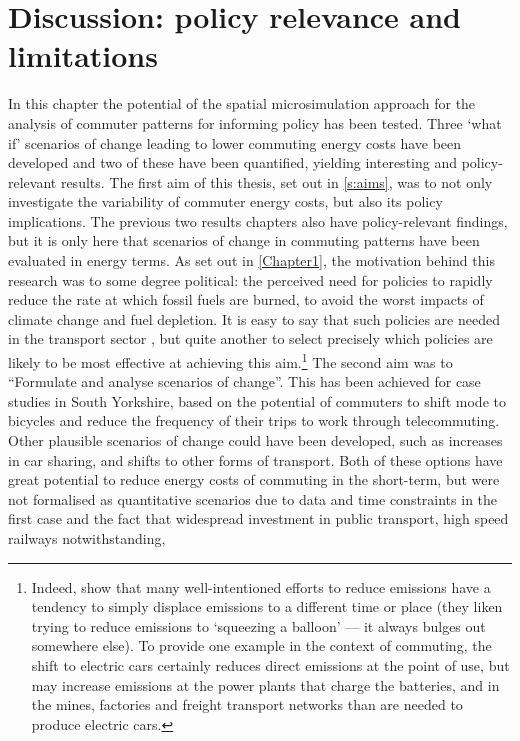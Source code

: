 \section{Discussion: policy relevance and limitations}
\label{fc8discus}
In this chapter the potential of the spatial microsimulation approach
for the analysis of commuter patterns 
for informing policy has been tested. Three `what if' scenarios of change
leading to lower commuting energy costs have been developed and two of
these have been quantified, yielding interesting and policy-relevant results.
The first aim of this thesis, set out in \cref{s:aims}, was to not
only investigate the variability of commuter energy costs, but also its
policy implications. The previous two results chapters also have policy-relevant
findings, but it is only here that scenarios of change in commuting patterns
have been evaluated in energy terms. As set out in \cref{Chapter1}, the
motivation behind this research was to some degree political: the perceived
need for policies to rapidly reduce the rate at which fossil fuels are burned,
to avoid the worst impacts of climate change and fuel depletion.
It is easy to say that such policies are needed in the transport sector
\citep{Chapman2007}, but quite another to select precisely which policies
are likely to be most effective at achieving this
aim.\footnote{Indeed, \citet{Berners-Lee2013}
show that many well-intentioned efforts to reduce emissions have
a tendency to simply displace emissions to a different time or place
(they liken trying to reduce emissions to `squeezing a balloon' --- it
always bulges out somewhere else). To provide one example in the context
of commuting, the shift to electric cars certainly reduces direct emissions
at the point of use, but may increase emissions at the power plants that
charge the batteries, and in the mines, factories and freight transport
networks than are needed to produce electric cars. 
}
The second aim  was to ``Formulate and analyse scenarios of change''.
This has been achieved for case studies in South Yorkshire, based on the
potential of commuters to shift mode to bicycles and reduce the frequency
of their trips to work through telecommuting. Other plausible scenarios of
change could have been developed, such as increases in car sharing, and
shifts to other forms of transport.
Both of these options have great potential to reduce energy costs of commuting
in the short-term, but were not formalised as quantitative scenarios due to
data and time constraints in the first case and the fact that widespread
investment in public transport, high speed railways notwithstanding,
